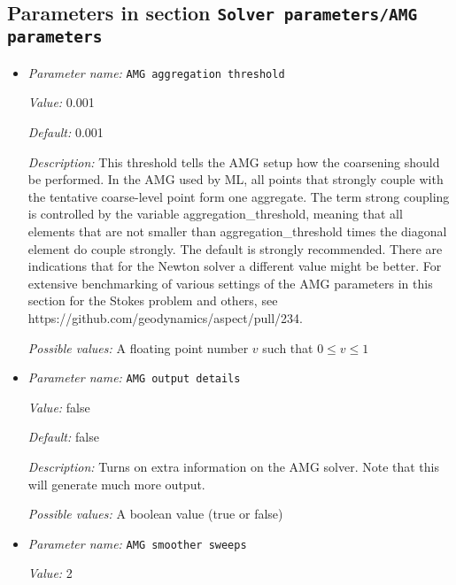 \subsection{Parameters in section \tt Solver parameters/AMG parameters}
\label{parameters:Solver_20parameters/AMG_20parameters}

\begin{itemize}
\item {\it Parameter name:} {\tt AMG aggregation threshold}
\label{parameters:Solver parameters/AMG parameters/AMG aggregation threshold}


{\it Value:} 0.001


{\it Default:} 0.001


{\it Description:} This threshold tells the AMG setup how the coarsening should be performed. In the AMG used by ML, all points that strongly couple with the tentative coarse-level point form one aggregate. The term strong coupling is controlled by the variable aggregation\_threshold, meaning that all elements that are not smaller than aggregation\_threshold times the diagonal element do couple strongly. The default is strongly recommended. There are indications that for the Newton solver a different value might be better. For extensive benchmarking of various settings of the AMG parameters in this section for the Stokes problem and others, see https://github.com/geodynamics/aspect/pull/234.


{\it Possible values:} A floating point number $v$ such that $0 \leq v \leq 1$
\item {\it Parameter name:} {\tt AMG output details}
\label{parameters:Solver parameters/AMG parameters/AMG output details}


{\it Value:} false


{\it Default:} false


{\it Description:} Turns on extra information on the AMG solver. Note that this will generate much more output.


{\it Possible values:} A boolean value (true or false)
\item {\it Parameter name:} {\tt AMG smoother sweeps}
\label{parameters:Solver parameters/AMG parameters/AMG smoother sweeps}


{\it Value:} 2



\end{itemize}
